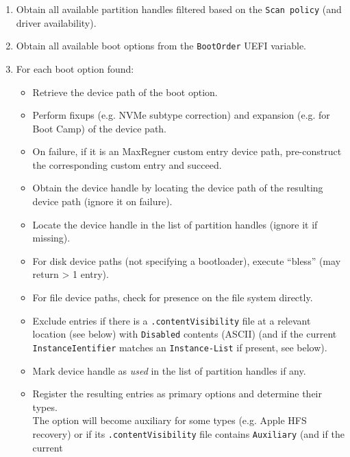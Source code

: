 \documentclass[]{article}
\providecommand{\tightlist}{%
  \setlength{\itemsep}{0pt}\setlength{\parskip}{0pt}}
\begin{document}
\begin{enumerate}
\tightlist
\item Obtain all available partition handles filtered based on the \texttt{Scan policy} (and driver availability).
\item Obtain all available boot options from the \texttt{BootOrder} UEFI variable.
\item For each boot option found:
  \begin{itemize}
  \item Retrieve the device path of the boot option.
  \item Perform fixups (e.g. NVMe subtype correction) and expansion (e.g. for Boot Camp) of the device path.
  \item On failure, if it is an MaxRegner custom entry device path, pre-construct the corresponding custom entry and succeed.
  \item Obtain the device handle by locating the device path of the resulting device path (ignore it on failure).
  \item Locate the device handle in the list of partition handles (ignore it if missing).
  \item For disk device paths (not specifying a bootloader), execute ``bless'' (may return > 1 entry).
  \item For file device paths, check for presence on the file system directly.
  \item Exclude entries if there is a \texttt{.contentVisibility} file at a relevant location (see below)
  with \texttt{Disabled} contents (ASCII) (and if the current \texttt{InstanceIentifier} matches an \texttt{Instance-List}
  if present, see below).
  \item Mark device handle as \textit{used} in the list of partition handles if any.
  \item Register the resulting entries as primary options and determine their types. \\
  The option will become auxiliary for some types (e.g. Apple HFS recovery)
  or if its \texttt{.contentVisibility} file contains \texttt{Auxiliary} (and if the current

\end{itemize}
\end{enumerate}
\end{document}

